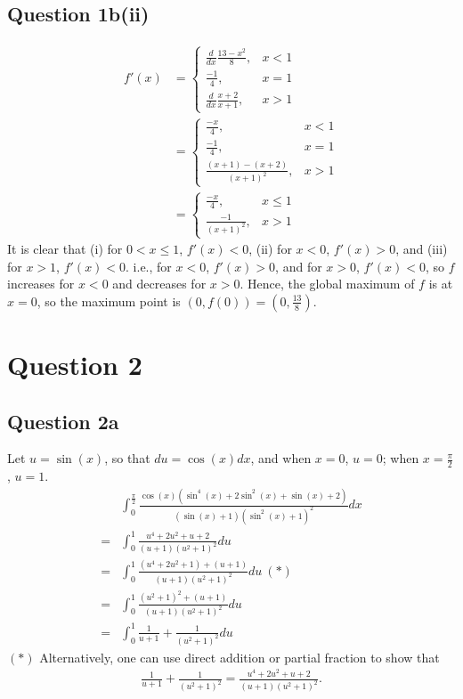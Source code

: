 \documentclass[12pt]{article}
\begin{document}
\subsection*{Question 1b(ii)}
\begin{align*}
    f'(x) &= \begin{cases}
    \frac{d}{dx}\frac{13-x^2}{8}, & x<1\\
    \frac{-1}{4}, & x=1\\
    \frac{d}{dx}\frac{x+2}{x+1}, & x>1
    \end{cases}\\
    &= \begin{cases}
    \frac{-x}{4}, & x<1\\
    \frac{-1}{4}, & x=1\\
    \frac{(x+1)-(x+2)}{(x+1)^2}, & x>1
    \end{cases}\\
    &= \begin{cases}
    \frac{-x}{4}, & x\leq1\\
    \frac{-1}{(x+1)^2}, & x>1
    \end{cases}
\end{align*}
It is clear that (i) for $0<x\leq 1$, $f'(x)<0$, (ii) for $x<0$, $f'(x)>0$, and (iii) for $x>1$, $f'(x)<0$. i.e., for $x<0$, $f'(x)>0$, and for $x>0$, $f'(x)<0$, so $f$ increases for $x<0$ and decreases for $x>0$. Hence, the global maximum of $f$ is at $x=0$, so the maximum point is $(0, f(0))=(0,\frac{13}{8})$.

\newpage
\section*{Question 2}
\subsection*{Question 2a}
Let $u=\sin(x)$, so that $du = \cos(x) dx$, and when $x=0$, $u=0$; when $x=\frac{\pi}{2}$, $u=1$. 
\begin{align*}
    &\int_0^{\frac{\pi}{2}}\frac{\cos(x)(\sin^4(x)+2\sin^2(x)+\sin(x)+2)}{(\sin(x)+1)(\sin^2(x)+1)^2}dx\\ 
    =& \int_0^1\frac{u^4+2u^2+u+2}{(u+1)(u^2+1)^2}du\\
    =& \int_0^1\frac{(u^4+2u^2+1)+(u+1)}{(u+1)(u^2+1)^2}du\:(*)\\
    =& \int_0^1\frac{(u^2+1)^2+(u+1)}{(u+1)(u^2+1)^2}du\\
    =& \int_0^1\frac{1}{u+1}+\frac{1}{(u^2+1)^2}du
\end{align*}
$(*)$ Alternatively, one can use direct addition or partial fraction to show that
\begin{align*}
    \frac{1}{u+1}+\frac{1}{(u^2+1)^2} = \frac{u^4+2u^2+u+2}{(u+1)(u^2+1)^2}.
\end{align*}
\end{document}
